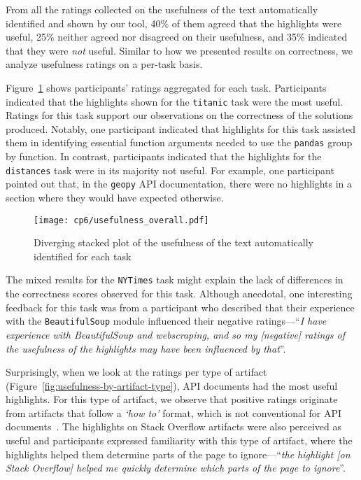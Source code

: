 From all the ratings collected on the  usefulness of the text automatically identified and shown by our tool, 40\% of them agreed that the highlights were useful, 
25\% neither agreed nor disagreed on their usefulness, and 35\% indicated that they were \textit{not} useful.
Similar to how we presented results on correctness, we analyze usefulness ratings on a per-task basis.  



Figure~\ref{fig:usefulness-by-task} shows participants' ratings aggregated for each task. 
Participants indicated that the highlights shown for the \texttt{titanic} task were the most useful. 
Ratings for this task support our observations on the correctness of the solutions produced. 
Notably, one participant indicated that highlights for this task assisted them in identifying essential function arguments needed to use the \texttt{pandas} group by function.
In contrast, participants indicated that the highlights for the \texttt{distances} task were in its majority not useful. 
For example, one participant pointed out that, in the \texttt{geopy} API documentation, there were no highlights in 
a section where they would have expected otherwise.



\begin{figure}
    \centering
    \texttt{[image: cp6/usefulness\_overall.pdf]}
    \caption{Diverging stacked plot of the usefulness of the text automatically identified for each task}
    \label{fig:usefulness-by-task}
\end{figure}


The mixed results for the \texttt{NYTimes} task might explain the lack of differences in the correctness scores observed for this task. 
Although anecdotal, one interesting feedback for this task was from a participant who described that 
their experience with the \texttt{BeautifulSoup} module influenced their negative ratings---``\textit{I have experience with BeautifulSoup and webscraping, and so my [negative] ratings of the usefulness of the highlights may have been influenced by that}''.



Surprisingly, when we look at the ratings per type of artifact (Figure~\ref{fig:usefulness-by-artifact-type}), API documents had the most useful highlights.
For this type of artifact, we observe that positive ratings originate from artifacts that follow a \textit{`how to'} format,
which is not conventional for API documents~\cite{robillard2011field, arya2020}. The highlights on Stack Overflow artifacts were also perceived as useful
and participants expressed familiarity with this type of artifact, where the highlights helped them determine parts of the page to ignore---``\textit{the highlight [on Stack Overflow] helped me quickly determine which parts of the page to ignore}''.



